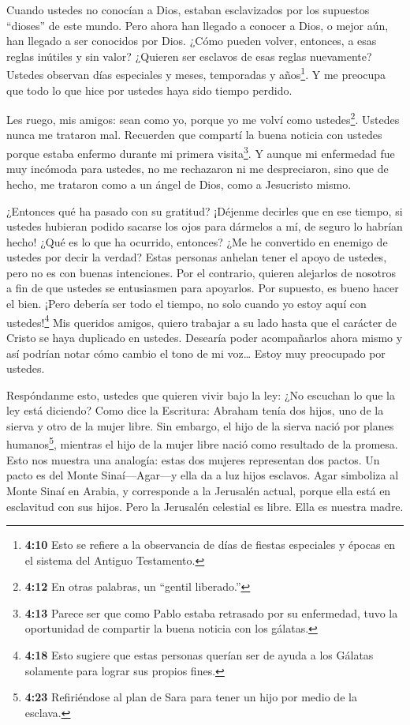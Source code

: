 Cuando ustedes no conocían a Dios, estaban esclavizados por
los supuestos ``dioses'' de este mundo.  Pero ahora han
llegado a conocer a Dios, o mejor aún, han llegado a ser conocidos por
Dios. ¿Cómo pueden volver, entonces, a esas reglas inútiles y sin valor?
¿Quieren ser esclavos de esas reglas nuevamente?  Ustedes
observan días especiales y meses, temporadas y años\footnote{\textbf{4:10}
  Esto se refiere a la observancia de días de fiestas especiales y
  épocas en el sistema del Antiguo Testamento.}.  Y me
preocupa que todo lo que hice por ustedes haya sido tiempo perdido.

 Les ruego, mis amigos: sean como yo, porque yo me volví
como ustedes\footnote{\textbf{4:12} En otras palabras, un ``gentil
  liberado.''}. Ustedes nunca me trataron mal.  Recuerden
que compartí la buena noticia con ustedes porque estaba enfermo durante
mi primera visita\footnote{\textbf{4:13} Parece ser que como Pablo
  estaba retrasado por su enfermedad, tuvo la oportunidad de compartir
  la buena noticia con los gálatas.}.  Y aunque mi
enfermedad fue muy incómoda para ustedes, no me rechazaron ni me
despreciaron, sino que de hecho, me trataron como a un ángel de Dios,
como a Jesucristo mismo.

 ¿Entonces qué ha pasado con su gratitud? ¡Déjenme decirles
que en ese tiempo, si ustedes hubieran podido sacarse los ojos para
dármelos a mí, de seguro lo habrían hecho!  ¿Qué es lo que
ha ocurrido, entonces? ¿Me he convertido en enemigo de ustedes por decir
la verdad?  Estas personas anhelan tener el apoyo de
ustedes, pero no es con buenas intenciones. Por el contrario, quieren
alejarlos de nosotros a fin de que ustedes se entusiasmen para
apoyarlos.  Por supuesto, es bueno hacer el bien. ¡Pero
debería ser todo el tiempo, no solo cuando yo estoy aquí con
ustedes!\footnote{\textbf{4:18} Esto sugiere que estas personas querían
  ser de ayuda a los Gálatas solamente para lograr sus propios fines.}
 Mis queridos amigos, quiero trabajar a su lado hasta que
el carácter de Cristo se haya duplicado en ustedes. 
Desearía poder acompañarlos ahora mismo y así podrían notar cómo cambio
el tono de mi voz\ldots{} Estoy muy preocupado por ustedes.

 Respóndanme esto, ustedes que quieren vivir bajo la ley:
¿No escuchan lo que la ley está diciendo?  Como dice la
Escritura: Abraham tenía dos hijos, uno de la sierva y otro de la mujer
libre.  Sin embargo, el hijo de la sierva nació por planes
humanos\footnote{\textbf{4:23} Refiriéndose al plan de Sara para tener
  un hijo por medio de la esclava.}, mientras el hijo de la mujer libre
nació como resultado de la promesa.  Esto nos muestra una
analogía: estas dos mujeres representan dos pactos. Un pacto es del
Monte Sinaí---Agar---y ella da a luz hijos esclavos.  Agar
simboliza al Monte Sinaí en Arabia, y corresponde a la Jerusalén actual,
porque ella está en esclavitud con sus hijos.  Pero la
Jerusalén celestial es libre. Ella es nuestra madre.

